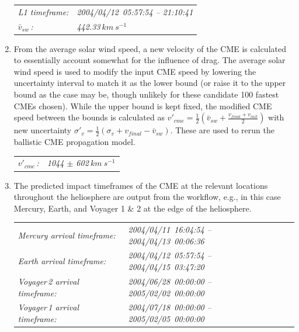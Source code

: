 \documentclass[namedreferences]{SolarPhysics}
\begin{document}
\begin{article}
\begin{enumerate}
\begin{tabular}{l l}
\emph{L1 timeframe:} & \emph{2004/04/12~05:57:54 -- 21:10:41} \\
\emph{$\bar{v}_{sw}$\,:} & \emph{442.33$~km~s^{-1}$} \\
\end{tabular}


\item From the average solar wind speed, a new velocity of the CME is calculated to essentially account somewhat for the influence of drag. The average solar wind speed is used to modify the input CME speed by lowering the uncertainty interval to match it as the lower bound (or raise it to the upper bound as the case may be, though unlikely for these candidate 100 fastest CMEs chosen). While the upper bound is kept fixed, the modified CME speed between the bounds is calculated as $v'_{cme} = \frac{1}{2} \left( \bar{v}_{sw} + \frac{v_{final}+v_{init}}{2} \right)$ with new uncertainty $\sigma'_v = \frac{1}{2}\left(\sigma_v +v_{final}- \bar{v}_{sw}\right)$. These are used to rerun the ballistic CME propagation model.

\begin{tabular}{l l}
\emph{$v'_{cme}$\,:} & \emph{1044 $\pm$ 602$~km~s^{-1}$} \\
\end{tabular}

\item The predicted impact timeframes of the CME at the relevant locations throughout the heliosphere are output from the workflow, e.g., in this case Mercury, Earth, and Voyager 1 \& 2 at the edge of the heliosphere. 

\begin{tabular}{l l}
\emph{Mercury arrival timeframe:} & \emph{2004/04/11~16:04:54 -- 2004/04/13~00:06:36} \\
\emph{Earth arrival timeframe:} & \emph{2004/04/12~05:57:54 -- 2004/04/15~03:47:20} \\
\emph{Voyager\,2 arrival timeframe:} & \emph{2004/06/28~00:00:00 -- 2005/02/02~00:00:00} \\
\emph{Voyager\,1 arrival timeframe:} & \emph{2004/07/18~00:00:00 -- 2005/02/05~00:00:00} \\
\end{tabular}

\end{enumerate}


\end{article}
\end{document}
